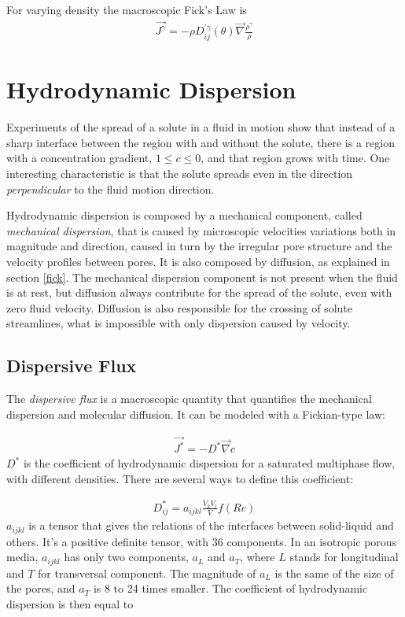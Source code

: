\documentclass[11pt,twoside]{report}
\begin{document}
For varying density the macroscopic Fick's Law is
\begin{align}
   \vec{J^{\gamma}} = -\rho D_{ij}^{'\gamma}(\theta) \vec{\nabla}\frac{\rho^{\gamma}}{\rho}
\end{align}

\section{Hydrodynamic Dispersion}
Experiments of the spread of a solute in a fluid in motion show that instead of a sharp interface between the region with and without the solute, there is a region with a concentration gradient, $1 \leq c \leq 0$, and that region grows with time. One interesting characteristic is that the solute spreads even in the direction \textit{perpendicular} to the fluid motion direction.

Hydrodynamic dispersion is composed by a mechanical component, called \textit{mechanical dispersion}, that is caused by microscopic velocities variations both in magnitude and direction, caused in turn by the irregular pore structure and the velocity profiles between pores. It is also composed by diffusion, as explained in section \eqref{fick}. The mechanical dispersion component is not present when the fluid is at rest, but diffusion always contribute for the spread of the solute, even with zero fluid velocity. Diffusion is also responsible for the crossing of solute streamlines, what is impossible with only dispersion caused by velocity. 

\subsection{Dispersive Flux}
The \textit{dispersive flux} is a macroscopic quantity that quantifies the mechanical dispersion and molecular diffusion. It can be modeled with a Fickian-type law:

\begin{align}
   \vec{J^{*}} = -D^{*} \vec{\nabla}c
\end{align}
$D^{*}$ is the coefficient of hydrodynamic dispersion for a saturated multiphase flow, with different densities. There are several ways to define this coefficient:

\begin{align}
   D^{*}_{ij} = a_{ijkl}\frac{V_{k}V_{l}}{V}f(Re)
\end{align}
$a_{ijkl}$ is a tensor that gives the relations of the interfaces between solid-liquid and others. It's a positive definite tensor, with 36 components. In an isotropic porous media, $a_{ijkl}$ has only two components, $a_{L}$ and $a_{T}$, where $L$ stands for longitudinal and $T$ for transversal component. The magnitude of $a_{L}$ is the same of the size of the pores, and $a_{T}$ is 8 to 24 times smaller. The coefficient of hydrodynamic dispersion is then equal to 
\end{document}
